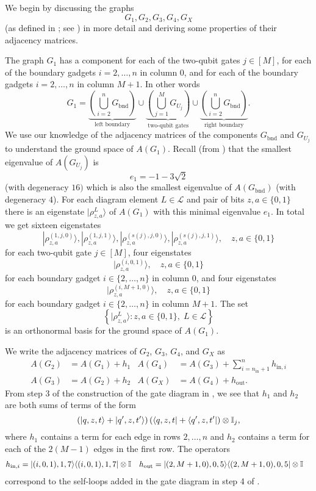 \documentclass[../thesis-main/thesis-main]{subfiles}
\begin{document}
We begin by discussing the graphs
\[
G_{1},G_{2},G_{3},G_{4},G_X
\]
(as defined in ; see ) in more detail and deriving some properties of their adjacency matrices.

The graph $G_{1}$ has a component for each of the two-qubit gates $j \in [M]$, for each of the boundary gadgets $i=2,\ldots,n$ in column $0$, and for each of the boundary gadgets $i=2,\ldots,n$ in column $M+1$. In other words 
\begin{equation}
G_{1}=\underbrace{\left(\bigcup_{i=2}^{n}G_{\text{bnd}}\right)}_{\text{left boundary}}\cup\underbrace{\left(\bigcup_{j=1}^{M}G_{U_j}\right)}_{\text{two-qubit gates}}\cup\underbrace{\left(\bigcup_{i=2}^{n}G_{\text{bnd}}\right)}_{\text{right boundary}}.\label{eq:G_alpha}
\end{equation}
We use our knowledge of the adjacency matrices of the components $G_\text{bnd}$ and $G_{U_j}$ to understand the ground space of $A(G_1)$.  Recall (from ) that the smallest eigenvalue of $A(G_{U_j})$ is 
\[
e_{1}=-1-3\sqrt{2}
\]
(with degeneracy $16)$ which is also the smallest eigenvalue of $A(G_{\text{bnd}})$ (with degeneracy $4$). For each diagram element $L\in\mathcal{L}$ and pair of bits $z,a\in\{0,1\}$ there is an eigenstate $|\rho_{z,a}^{L}\rangle$ of $A(G_{1})$ with this minimal eigenvalue $e_{1}$. In total we get sixteen eigenstates
\[
|\rho_{z,a}^{(1,j,0)}\rangle,|\rho_{z,a}^{(1,j,1)}\rangle,|\rho_{z,a}^{(s(j),j,0)}\rangle,|\rho_{z,a}^{(s(j),j,1)}\rangle,\quad z,a\in\{0,1\}
\]
for each two-qubit gate $j\in[M]$, four eigenstates 
\[
|\rho_{z,a}^{(i,0,1)}\rangle,\quad z,a\in\{0,1\}
\]
for each boundary gadget $i\in\{2,\ldots,n\}$ in column $0$, and four eigenstates 
\[
|\rho_{z,a}^{(i,M+1,0)}\rangle,\quad z,a\in\{0,1\}
\]
for each boundary gadget $i\in\{2,\ldots,n\}$ in column $M+1$. The set 
\[
\left\{ |\rho_{z,a}^{L}\rangle\colon z,a\in\{0,1\},\; L\in\mathcal{L}\right\} 
\]
is an orthonormal basis for the ground space of $A(G_{1})$. 

We write the adjacency matrices of $G_{2}$, $G_{3}$, $G_{4}$, and $G_X$ as 
\begin{align*}
  A(G_{2}) &= A(G_{1})+h_{1} & 
  A(G_{4}) &= A(G_{3})+\sum_{i=n_{\text{in}}+1}^{n}h_{\text{in},i} \\
  A(G_{3}) &= A(G_{2})+h_{2} &
  A(G_X)   &= A(G_{4})+h_{\text{out}}.
\end{align*}
From step 3 of the construction of the gate diagram in , we see that $h_{1}$ and $h_{2}$ are both sums of terms of the form 
\[
  \left(|q,z,t\rangle+|q^{\prime},z,t^{\prime}\rangle\right)
  \left(\langle q,z,t|+\langle q^{\prime},z,t^{\prime}|\right)\otimes\mathbb{I}_{j},
\]
where $h_1$ contains a term for each edge in rows $2,\ldots, n$ and $h_2$ contains a term for each of the $2(M-1)$ edges in the first row. The operators
\begin{align}
  h_{\mathrm{in},i} &= |(i,0,1),1,7\rangle\langle(i,0,1),1,7|\otimes\mathbb{I} &
  h_{\text{out}} &= |(2,M+1,0),0,5\rangle\langle(2,M+1,0),0,5|\otimes\mathbb{I}
\label{eq:hin_i}
\end{align}
correspond to the self-loops added in the gate diagram in step 4 of . 
\end{document}
